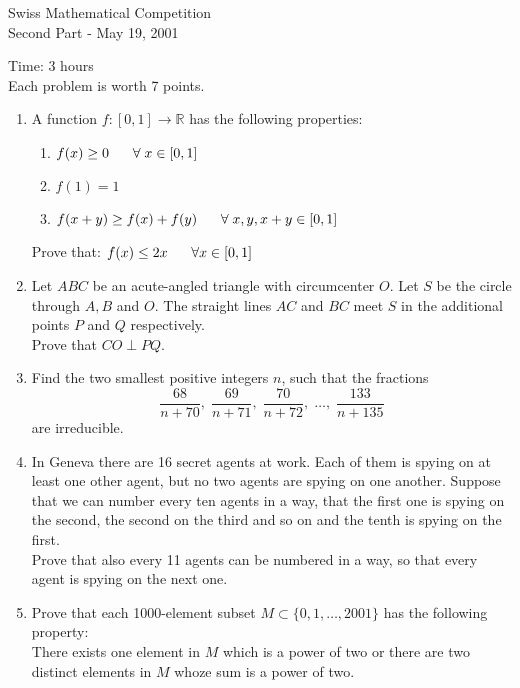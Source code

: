 \documentclass[12pt]{article}
\begin{document}
\begin{center}
{\Large Swiss Mathematical Competition} \\
\medskip Second Part - May 19, 2001
\end{center}
\vspace{4mm}
Time: 3 hours\\
Each problem is worth 7 points.

\begin{enumerate}
\item A function $f:[0,1]\rightarrow\mathbb{R}$ has the
following properties:

\begin{enumerate}
  \item $f(x) \geq 0 \hspace{6mm} \forall \; x \in [0,1]$
  \item $f(1) = 1$
  \item $f(x+y) \geq f(x)+f(y) \hspace{6mm} \forall \; x, y, x+y \in [0,1]$
\end{enumerate}

Prove that: $f(x)\leq 2x \hspace{6mm} \forall x \in [0,1]$

\item Let $ABC$ be an acute-angled triangle with circumcenter $O$.
Let $S$ be the circle through $A, B$ and $O$. The straight lines
$AC$ and $BC$ meet $S$ in the
additional points $P$ and $Q$ respectively.\\
Prove that $CO \perp PQ$.

\item Find the two smallest positive integers $n$, such that the
fractions
$$ \frac{68}{n+70}, \; \frac{69}{n+71},\; \frac{70}{n+72},\; \ldots,
\; \frac{133}{n+135}$$ are irreducible.

\item In Geneva there are 16 secret agents at work. Each of them is
spying on at least one other agent, but no two agents are spying
on one another. Suppose that we can number every ten agents in a
way, that the first one is spying on the second, the second on the
third and so on and the
tenth is spying on the first.\\
Prove that also every 11 agents can be numbered in a way, so that
every agent is spying on the next one.

\item Prove that each 1000-element subset $M
\subset \{0, 1, \ldots, 2001 \}$ has the following property:\\
There exists one element in $M$ which is a power of two or there
are two distinct elements in $M$ whoze sum is a power of two.


\end{enumerate}
\end{document}
